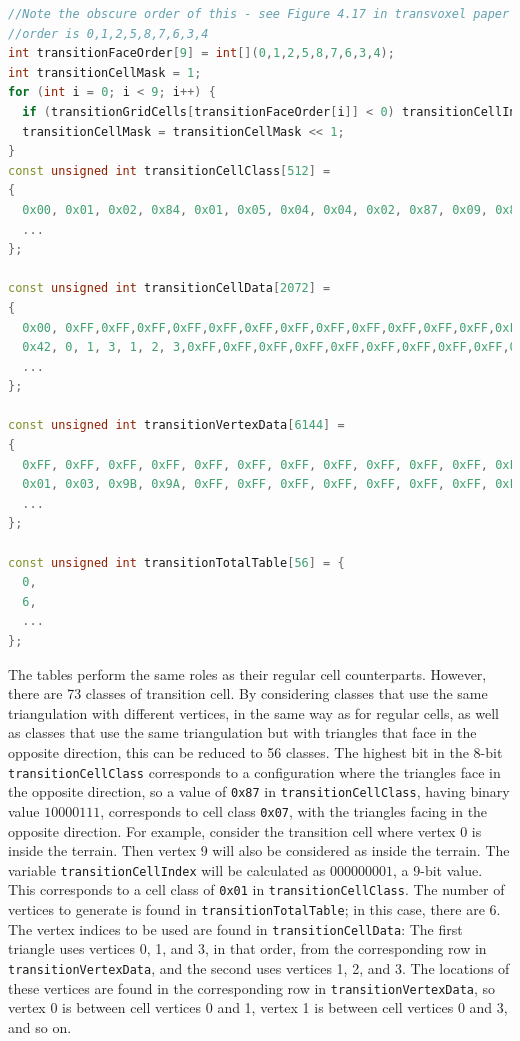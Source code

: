\documentclass[11pt]{article}
\begin{document}
\begin{lstlisting}[language=C++, label={tv_transition_tables}, caption={Calculation of \texttt{transitionCellIndex}, and lookup tables for transition cells in the Transvoxel algorithm. An example of their usage is given below.}]
//Note the obscure order of this - see Figure 4.17 in transvoxel paper
//order is 0,1,2,5,8,7,6,3,4
int transitionFaceOrder[9] = int[](0,1,2,5,8,7,6,3,4);
int transitionCellMask = 1;
for (int i = 0; i < 9; i++) {
  if (transitionGridCells[transitionFaceOrder[i]] < 0) transitionCellIndex |= transitionCellMask;
  transitionCellMask = transitionCellMask << 1;
}
const unsigned int transitionCellClass[512] =
{
  0x00, 0x01, 0x02, 0x84, 0x01, 0x05, 0x04, 0x04, 0x02, 0x87, 0x09, 0x8C, 0x84, 0x0B, 0x05, 0x05,
  ...
};

const unsigned int transitionCellData[2072] =
{
  0x00, 0xFF,0xFF,0xFF,0xFF,0xFF,0xFF,0xFF,0xFF,0xFF,0xFF,0xFF,0xFF,0xFF,0xFF,0xFF,0xFF,0xFF,0xFF,0xFF,0xFF,0xFF,0xFF,0xFF,0xFF,0xFF,0xFF,0xFF,0xFF,0xFF,0xFF,0xFF,0xFF,0xFF,0xFF,0xFF,0xFF,
  0x42, 0, 1, 3, 1, 2, 3,0xFF,0xFF,0xFF,0xFF,0xFF,0xFF,0xFF,0xFF,0xFF,0xFF,0xFF,0xFF,0xFF,0xFF,0xFF,0xFF,0xFF,0xFF,0xFF,0xFF,0xFF,0xFF,0xFF,0xFF,0xFF,0xFF,0xFF,0xFF,0xFF,0xFF,
  ...
};

const unsigned int transitionVertexData[6144] =
{
  0xFF, 0xFF, 0xFF, 0xFF, 0xFF, 0xFF, 0xFF, 0xFF, 0xFF, 0xFF, 0xFF, 0xFF,
  0x01, 0x03, 0x9B, 0x9A, 0xFF, 0xFF, 0xFF, 0xFF, 0xFF, 0xFF, 0xFF, 0xFF,
  ...
};

const unsigned int transitionTotalTable[56] = {
  0,
  6,
  ...
};       
\end{lstlisting}

The tables perform the same roles as their regular cell counterparts. However, there are 73 classes of transition cell. By considering classes that use the same triangulation with different vertices, in the same way as for regular cells, as well as classes that use the same triangulation but with triangles that face in the opposite direction, this can be reduced to 56 classes. 
The highest bit in the 8-bit \texttt{transitionCellClass} corresponds to a configuration where the triangles face in the opposite direction, so a value of \texttt{0x87} in \texttt{transitionCellClass}, having binary value $10000111$, corresponds to cell class \texttt{0x07}, with the triangles facing in the opposite direction. 
For example, consider the transition cell where vertex 0 is inside the terrain. Then vertex 9 will also be considered as inside the terrain. The variable \texttt{transitionCellIndex} will be calculated as $000000001$, a 9-bit value. This corresponds to a cell class of \texttt{0x01} in \texttt{transitionCellClass}. 
The number of vertices to generate is found in \texttt{transitionTotalTable}; in this case, there are 6. The vertex indices to be used are found in \texttt{transitionCellData}: The first triangle uses vertices 0, 1, and 3, in that order, from the corresponding row in \texttt{transitionVertexData}, and the second uses vertices 1, 2, and 3.
The locations of these vertices are found in the corresponding row in \texttt{transitionVertexData}, so vertex 0 is between cell vertices 0 and 1, vertex 1 is between cell vertices 0 and 3, and so on.
\end{document}
